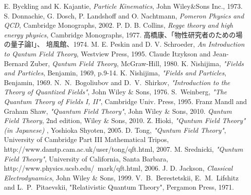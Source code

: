 \documentclass[12pt]{article}
\begin{document}
\newpage
\begin{thebibliography}{9}
 E. Byckling and K. Kajantie,  {\it Particle Kinematics}, John Wiley\&Sons Inc., 1973.
 S. Donnachie, G. Dosch, P. Landshoff and O. Nachtmann, 
	{\it Pomeron Physics and QCD}, Cambridge Monographs, 2002.
 P. D. B. Collins,
	{\it Regge theory and high energy physics}, Cambridge Monographs, 1977.
 高橋康、「物性研究者のための場の量子論I」、
	培風館、1974.
 M. E. Peskin and D. V. Schroeder,
	{\it An Introduction to Qantum Field Theory}, Westview Press, 1995.
 Claude Itzykson and Jean-Bernard Zuber,
	{\it Qantum Field Theory}, McGraw-Hill, 1980.
 K. Nishijima, {\it "Fields and Particles}, Benjamin, 1969, p.9-14.
 K. Nishijima, {\it "Fields and Particles}, Benjamin, 1969.
 N.~N.~Bogoliubov and D.~V.~Shirkov, {\it "Introduction to the Theory of Quantized Fields"},
John Wiley \& Sons, 1976.
 S.~Weinberg, {\it "The Quantum Theory of Fields I, II"}, Cambridge Univ. Press, 1995.
 Franz Mandl and Graham Shaw, {\it "Quantum Field Theory"}, John Wiley \& Sons, 2010.
	{\it Qantum Field Theory}, 2nd edition, Wiley \& Sons, 2010.
 Z. Hioki, {\it "Quntum Field Theory" (in Japanese) }, Yoshioka Shyoten, 2005.
 D. Tong, {\it "Quntum Field Theory"}, University of Cambridge Part III Mathematical Tripos,
http://www.damtp.cam.ac.uk/user/tong/qft.html, 2007.
 M. Srednicki, {\it "Quntum Field Theory"}, University of California, Santa Barbara,
http://www.physics.ucsb.edu/~mark/qft.html, 2006.
 J. D. Jackson,
	{\it Classical Electrodynamics}, John Wiley \& Sons, 1999.
 V.~B.~Berestetskii, E.~M.~Lifshitz and L.~P.~Pitaevskii,
"Relativistic Quantum Theory", Pergamon Press, 1971.
\end{thebibliography}
\end{document}
